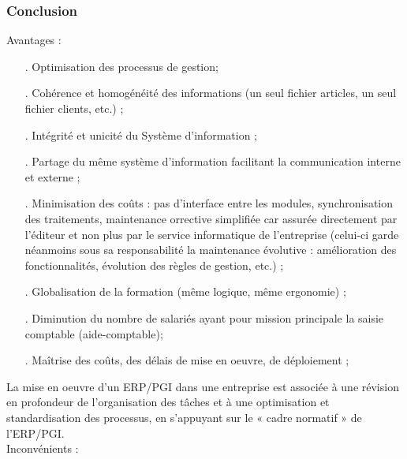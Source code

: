 \subsubsection{Conclusion}
Avantages :
\begin{itemize}
\item[.]Optimisation des processus de gestion;
\item[.]Cohérence et homogénéité des informations (un seul fichier articles, un seul fichier clients, etc.) ;
\item[.]Intégrité et unicité du Système d'information ;
\item[.]Partage du même système d’information facilitant la communication interne et externe ;
\item[.]Minimisation des coûts : pas d’interface entre les modules, synchronisation des traitements, maintenance orrective simplifiée car assurée directement par l'éditeur et non plus par le service informatique de l'entreprise (celui-ci garde néanmoins sous sa responsabilité la maintenance évolutive : amélioration des fonctionnalités, évolution des règles de gestion, etc.) ;
\item[.]Globalisation de la formation (même logique, même ergonomie) ;
\item[.]Diminution du nombre de salariés ayant pour mission principale la saisie comptable (aide-comptable);
\item[.]Maîtrise des coûts, des délais de mise en oeuvre, de déploiement ;\\
\end{itemize}
La mise en oeuvre d'un ERP/PGI dans une entreprise est associée à une révision en profondeur de l'organisation des tâches et à une optimisation et standardisation des processus, en s'appuyant sur le « cadre normatif » de l'ERP/PGI.\\

Inconvénients :

